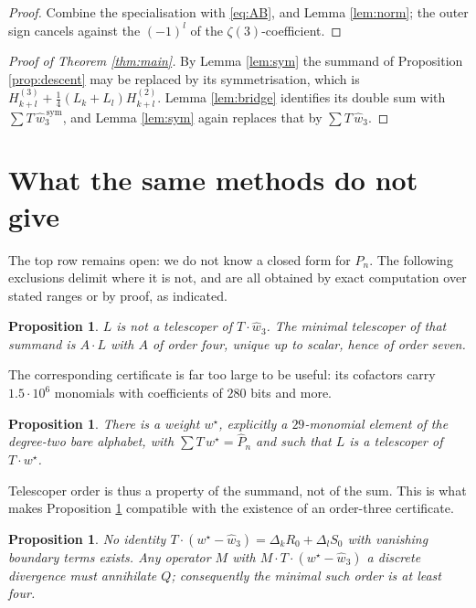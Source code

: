 \documentclass[11pt,a4paper]{amsart}
\theoremstyle{plain}
\newtheorem{proposition}[theorem]{Proposition}
\theoremstyle{definition}
\theoremstyle{remark}
\newcommand{\T}{T}
\begin{document}
\begin{proof}
Combine the specialisation with \eqref{eq:AB}, \cite[Lemma 4]{Zu02} and Lemma \ref{lem:norm};
the outer sign cancels against the $(-1)^l$ of the $\zeta(3)$-coefficient.
\end{proof}

\begin{proof}[Proof of Theorem \ref{thm:main}]
By Lemma \ref{lem:sym} the summand of Proposition \ref{prop:descent} may be replaced by its
symmetrisation, which is $H^{(3)}_{k+l}+\frac14(L_k+L_l)H^{(2)}_{k+l}$. Lemma \ref{lem:bridge}
identifies its double sum with $\sum\T\,\widehat w_3^{\,\mathrm{sym}}$, and Lemma \ref{lem:sym}
again replaces that by $\sum\T\,\widehat w_3$.
\end{proof}

\section{What the same methods do not give}\label{sec:neg}

The top row remains open: we do not know a closed form for $P_n$. The following exclusions
delimit where it is not, and are all obtained by exact computation over stated ranges or by
proof, as indicated.

\begin{proposition}\label{prop:order7}
$L$ is not a telescoper of $\T\cdot\widehat w_3$. The minimal telescoper of that summand is
$A\cdot L$ with $A$ of order four, unique up to scalar, hence of order seven.
\end{proposition}

The corresponding certificate is far too large to be useful: its cofactors carry $1.5\cdot10^6$
monomials with coefficients of $280$ bits and more.

\begin{proposition}\label{prop:wstar}
There is a weight $w^\star$, explicitly a $29$-monomial element of the degree-two bare alphabet,
with $\sum\T\,w^\star=\widehat P_n$ and such that $L$ \emph{is} a telescoper of
$\T\cdot w^\star$.
\end{proposition}

Telescoper order is thus a property of the summand, not of the sum. This is what makes
Proposition \ref{prop:order7} compatible with the existence of an order-three certificate.

\begin{proposition}\label{prop:bridge}
No identity $\T\cdot(w^\star-\widehat w_3)=\Delta_kR_0+\Delta_lS_0$ with vanishing boundary terms
exists. Any operator $M$ with $M\cdot\T\cdot(w^\star-\widehat w_3)$ a discrete divergence must
annihilate $Q$; consequently the minimal such order is at least four.
\end{proposition}
\end{document}
